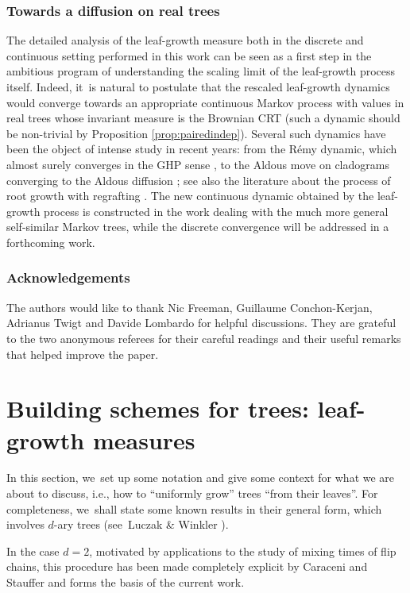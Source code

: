 \subsubsection*{Towards a diffusion on real trees} The detailed analysis of the leaf-growth measure both in the discrete and continuous setting performed in this work can be seen as a first step in the ambitious program of understanding the scaling limit of the leaf-growth process itself. Indeed, it~is natural to postulate that the rescaled leaf-growth dynamics would converge towards an appropriate continuous Markov process with values in real trees whose invariant measure is the Brownian CRT (such a dynamic should be non-trivial by Proposition \ref{prop:pairedindep}). Several such dynamics have been the \hbox{object} of intense study in recent years: from the Rémy dynamic, which almost surely converges in the GHP sense \cite{CurienHaas}, to the Aldous move on cladograms converging to the Aldous diffusion \cite{lohr2020aldous,FPRW18,FPRW20,forman2023aldous}; see also the literature about the process of root growth with regrafting \cite{MR2221786}. The new continuous dynamic obtained by the leaf-growth process is constructed in the work \cite{CFT25} dealing with the much more general self-similar Markov trees, while the discrete convergence will be addressed in a forthcoming work.

\subsubsection*{Acknowledgements}
The authors would like to thank Nic Freeman, Guillaume Conchon-Kerjan, Adrianus Twigt and Davide Lombardo for helpful discussions. They are grateful to the two anonymous referees for their careful readings and their useful remarks that helped improve the paper.

\section{Building schemes for trees: leaf-growth measures}\label{section:building schemes}

In this section, we~set up some notation and give some context for what we are about to discuss, i.e., how to ``uniformly grow'' trees ``from their leaves''. For completeness, we~shall state some known results in their general form, which involves $d$-ary trees (see~Luczak \& Winkler \cite{LW04}).

In the case $d=2$, motivated by applications to the study of mixing times of flip chains, this procedure has been made completely explicit by Caraceni and Stauffer \cite{CS20} and forms the basis of the current work.

